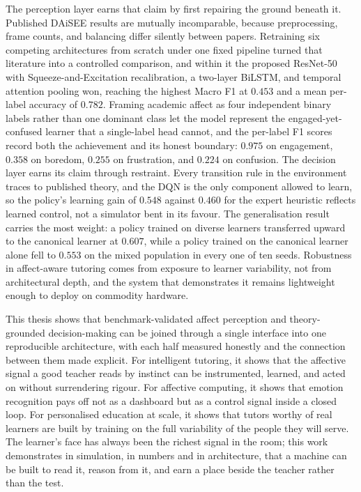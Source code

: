 The perception layer earns that claim by first repairing the ground beneath it. Published \ac{DAiSEE} results are mutually incomparable, because preprocessing, frame counts, and balancing differ silently between papers. Retraining six competing architectures from scratch under one fixed pipeline turned that literature into a controlled comparison, and within it the proposed ResNet-50 with Squeeze-and-Excitation recalibration, a two-layer \ac{BiLSTM}, and temporal attention pooling won, reaching the highest Macro F1 at $0.453$ and a mean per-label accuracy of $0.782$. Framing academic affect as four independent binary labels rather than one dominant class let the model represent the engaged-yet-confused learner that a single-label head cannot, and the per-label F1 scores record both the achievement and its honest boundary: $0.975$ on engagement, $0.358$ on boredom, $0.255$ on frustration, and $0.224$ on confusion. The decision layer earns its claim through restraint. Every transition rule in the environment traces to published theory, and the \ac{DQN} is the only component allowed to learn, so the policy's learning gain of $0.548$ against $0.460$ for the expert heuristic reflects learned control, not a simulator bent in its favour. The generalisation result carries the most weight: a policy trained on diverse learners transferred upward to the canonical learner at $0.607$, while a policy trained on the canonical learner alone fell to $0.553$ on the mixed population in every one of ten seeds. Robustness in affect-aware tutoring comes from exposure to learner variability, not from architectural depth, and the system that demonstrates it remains lightweight enough to deploy on commodity hardware.

This thesis shows that benchmark-validated affect perception and theory-grounded decision-making can be joined through a single interface into one reproducible architecture, with each half measured honestly and the connection between them made explicit. For intelligent tutoring, it shows that the affective signal a good teacher reads by instinct can be instrumented, learned, and acted on without surrendering rigour. For affective computing, it shows that emotion recognition pays off not as a dashboard but as a control signal inside a closed loop. For personalised education at scale, it shows that tutors worthy of real learners are built by training on the full variability of the people they will serve. The learner's face has always been the richest signal in the room; this work demonstrates in simulation, in numbers and in architecture, that a machine can be built to read it, reason from it, and earn a place beside the teacher rather than the test.
